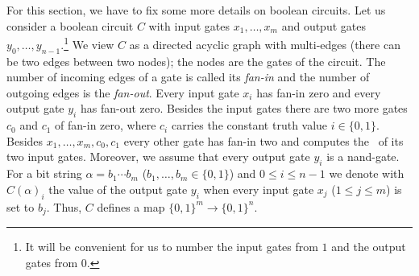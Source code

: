 For this section, we have to fix some more details on boolean circuits.
Let us consider a boolean circuit $C$ with input gates $x_1, \ldots, x_m$ 
and output gates $y_0, \ldots, y_{n-1}$.\footnote{It will be convenient for us to number the input gates from $1$ 
and the output gates from $0$.}
We view $C$ as a directed acyclic graph with multi-edges
(there can be two edges between two nodes); the nodes are the gates of the circuit.
The number of incoming edges of a gate is called its {\em fan-in} and the 
number of outgoing edges is the {\em fan-out}.
Every input gate $x_i$ has fan-in zero and every output gate $y_i$ has fan-out zero.
Besides the input gates there are two more gates $c_0$ and $c_1$ of fan-in zero, where
$c_i$ carries the constant truth value $i \in \{0,1\}$. Besides $x_1, \ldots, x_m, c_0, c_1$
every other gate has fan-in two and computes the \nand\ of its two input gates.
Moreover, we assume that every output gate $y_i$ is a {\sf nand}-gate.
For a bit string $\alpha = b_1 \cdots b_m$ ($b_1, \ldots, b_m \in \{0,1\}$) and $0 \leq i \leq n-1$
we denote with $C(\alpha)_i$ the value of the output gate $y_i$  when every input gate
$x_j$ ($1 \leq j \leq m$) is set to $b_j$. Thus, $C$ defines a map $\{0,1\}^m\to\{0,1\}^n$. 


